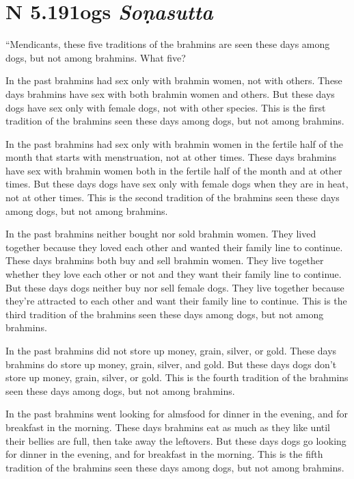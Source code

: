 \documentclass[12pt,openany]{book}%
\newcommand*{\suttatitleacronym}[1]{\smaller[2]{#1}\vspace*{.3em}}
\newcommand*{\suttatitletranslation}[1]{\linebreak{#1}}
\newcommand*{\suttatitleroot}[1]{\linebreak\smaller[2]\itshape{#1}}
\newcommand*{\tocacronym}[1]{\hspace*{-3.3em}{#1}\quad}
\newcommand*{\toctranslation}[1]{#1}
\newcommand*{\tocroot}[1]{(\textit{#1})}
\begin{document}
%
\section*{{\suttatitleacronym AN 5.191}{\suttatitletranslation Dogs }{\suttatitleroot Soṇasutta}}
\addcontentsline{toc}{section}{\tocacronym{AN 5.191} \toctranslation{Dogs } \tocroot{Soṇasutta}}

“Mendicants, these five traditions of the brahmins are seen these days among dogs, but not among brahmins. What five? 

In the past brahmins had sex only with brahmin women, not with others. These days brahmins have sex with both brahmin women and others. But these days dogs have sex only with female dogs, not with other species. This is the first tradition of the brahmins seen these days among dogs, but not among brahmins. 

In the past brahmins had sex only with brahmin women in the fertile half of the month that starts with menstruation, not at other times. These days brahmins have sex with brahmin women both in the fertile half of the month and at other times. But these days dogs have sex only with female dogs when they are in heat, not at other times. This is the second tradition of the brahmins seen these days among dogs, but not among brahmins. 

In the past brahmins neither bought nor sold brahmin women. They lived together because they loved each other and wanted their family line to continue. These days brahmins both buy and sell brahmin women. They live together whether they love each other or not and they want their family line to continue. But these days dogs neither buy nor sell female dogs. They live together because they’re attracted to each other and want their family line to continue. This is the third tradition of the brahmins seen these days among dogs, but not among brahmins. 

In the past brahmins did not store up money, grain, silver, or gold. These days brahmins do store up money, grain, silver, and gold. But these days dogs don’t store up money, grain, silver, or gold. This is the fourth tradition of the brahmins seen these days among dogs, but not among brahmins. 

In the past brahmins went looking for almsfood for dinner in the evening, and for breakfast in the morning. These days brahmins eat as much as they like until their bellies are full, then take away the leftovers. But these days dogs go looking for dinner in the evening, and for breakfast in the morning. This is the fifth tradition of the brahmins seen these days among dogs, but not among brahmins. 
\end{document}
